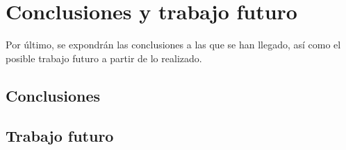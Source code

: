 \chapter{Conclusiones y trabajo futuro}\label{conclusiones}

Por último, se expondrán las conclusiones a las que se han llegado, así como el posible trabajo futuro a partir de lo realizado.

\section{Conclusiones}





\section{Trabajo futuro}